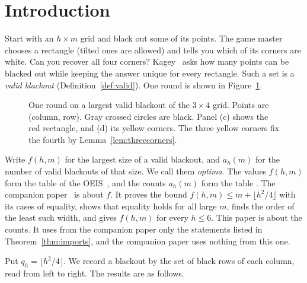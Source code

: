 \section{Introduction}\label{sec:intro}

Start with an $h\times m$ grid and black out some of its points.
The game master chooses a rectangle (tilted ones are allowed) and tells
you which of its corners are white. Can you recover all four corners?
Kagey~\cite{kagey001,kageyG4G14} asks how many points can be blacked out
while keeping the answer unique for every rectangle.
Such a set is a \emph{valid blackout} (Definition~\ref{def:valid}).
One round is shown in Figure~\ref{fig:game}.

\begin{figure}[t]
\centering
\resizebox{0.8\textwidth}{!}{}
\caption{One round on a largest valid blackout of the $3\times4$ grid. Points are
(column, row). Gray crossed circles are black. Panel (c) shows the red rectangle,
and (d) its yellow corners. The three yellow corners fix the fourth by
Lemma~\ref{lem:threecorners}.}
\label{fig:game}
\end{figure}

Write $f(h,m)$ for the largest size of a valid blackout, and $a_h(m)$ for the
number of valid blackouts of that size. We call them \emph{optima}. The
values $f(h,m)$ form the table  of the OEIS~\cite{oeis}, and
the counts $a_h(m)$ form the table . The companion
paper~\cite{pemmasaniExtremal} is about $f$. It proves the bound
$f(h,m)\le m+\lfloor h^2/4\rfloor$ with its cases of equality, shows that
equality holds for all large $m$, finds the order of the least such width, and
gives $f(h,m)$ for every $h\le6$. This paper is about the counts. It uses from
the companion paper only the statements listed in Theorem~\ref{thm:imports},
and the companion paper uses nothing from this one.

Put $q_h=\lfloor h^2/4\rfloor$. We record a blackout by the set of black rows
of each column, read from left to right. The results are as follows.

